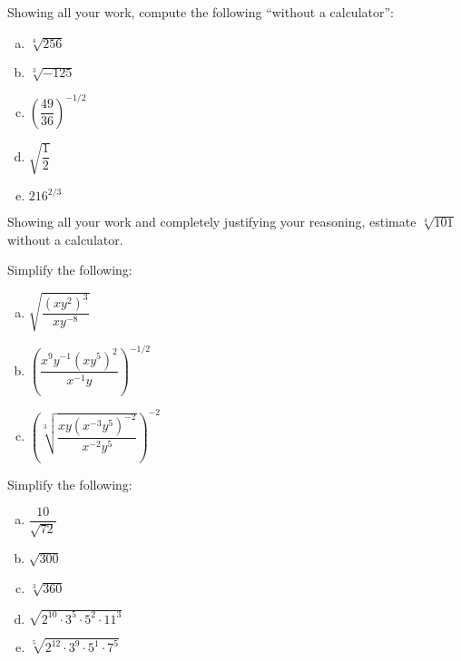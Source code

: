 \documentclass[11pt,letterpaper]{article}
\begin{document}

 Showing all your work, compute the following ``without a calculator'': 
	\begin{enumerate}[(a)]
	\item $\sqrt[4]{256}$
	\item $\sqrt[3]{-125}$
	\item $\left( \dfrac{49}{36} \right)^{-1/2}$
	\item $\sqrt{\dfrac{1}{2}}$
	\item $216^{2/3}$
	\end{enumerate}   



\newpage



 Showing all your work and completely justifying your reasoning, estimate $\sqrt[4]{101}$ without a calculator. 



\newpage



 Simplify the following:
	\begin{enumerate}[(a)]
	\item $\sqrt{\dfrac{(x y^2)^3}{x y^{-8}}}$
	\item $\left( \dfrac{x^9 y^{-1} (x y^5)^2}{x^{-1} y} \right)^{-1/2}$
	\item $\left( \sqrt[3]{\dfrac{xy (x^{-3} y^5)^{-2}}{x^{-2} y^5}} \right)^{-2}$
	\end{enumerate}   	



\newpage



 Simplify the following:
	\begin{enumerate}[(a)]
	\item $\dfrac{10}{\sqrt{72}}$
	\item $\sqrt{300}$
	\item $\sqrt[3]{360}$
	\item $\sqrt{2^{10} \cdot 3^5 \cdot 5^2 \cdot 11^{3}}$
	\item $\sqrt[5]{2^{12} \cdot 3^9 \cdot 5^1 \cdot 7^5}$
	\end{enumerate}   
\end{document}
